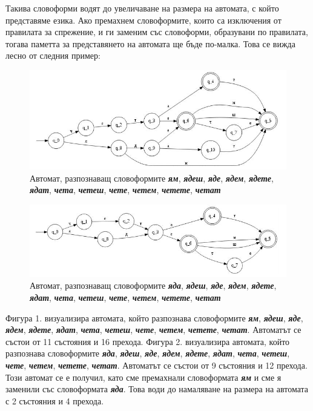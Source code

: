 \documentclass[a4paper,12pt]{article}
\begin{document}
  Такива словоформи водят до увеличаване на размера на автомата, с който представяме езика.
  Ако премахнем словоформите, които са изключения от правилата за спрежение, и ги заменим със словоформи, образувани по правилата,
  тогава паметта за представянето на автомата ще бъде по-малка.
  Това се вижда лесно от следния пример:

\begin{figure}[H]
  \centering
  \includegraphics{figures/example1.jpg}
  \caption{Автомат, разпознаващ словоформите \textbf{\emph{ям}}, \textbf{\emph{ядеш}}, \textbf{\emph{яде}},
  \textbf{\emph{ядем}}, \textbf{\emph{ядете}}, \textbf{\emph{ядат}},
  \textbf{\emph{чета}}, \textbf{\emph{четеш}}, \textbf{\emph{чете}},
  \textbf{\emph{четем}}, \textbf{\emph{четете}}, \textbf{\emph{четат}}}
\end{figure}

\begin{figure}[H]
  \centering
  \includegraphics{figures/example2.jpg}
  \caption{Автомат, разпознаващ словоформите \textbf{\emph{яда}}, \textbf{\emph{ядеш}}, \textbf{\emph{яде}},
  \textbf{\emph{ядем}}, \textbf{\emph{ядете}}, \textbf{\emph{ядат}},
  \textbf{\emph{чета}}, \textbf{\emph{четеш}}, \textbf{\emph{чете}},
  \textbf{\emph{четем}}, \textbf{\emph{четете}}, \textbf{\emph{четат}}}
\end{figure}

  Фигура 1. визуализира автомата, който разпознава словоформите
  \textbf{\emph{ям}}, \textbf{\emph{ядеш}}, \textbf{\emph{яде}},
  \textbf{\emph{ядем}}, \textbf{\emph{ядете}}, \textbf{\emph{ядат}},
  \textbf{\emph{чета}}, \textbf{\emph{четеш}}, \textbf{\emph{чете}},
  \textbf{\emph{четем}}, \textbf{\emph{четете}}, \textbf{\emph{четат}}.
  Автоматът се състои от 11 състояния и 16 прехода.
  Фигура 2. визуализира автомата, който разпознава словоформите
  \textbf{\emph{яда}}, \textbf{\emph{ядеш}}, \textbf{\emph{яде}},
  \textbf{\emph{ядем}}, \textbf{\emph{ядете}}, \textbf{\emph{ядат}},
  \textbf{\emph{чета}}, \textbf{\emph{четеш}}, \textbf{\emph{чете}},
  \textbf{\emph{четем}}, \textbf{\emph{четете}}, \textbf{\emph{четат}}.
  Автоматът се състои от 9 състояния и 12 прехода. Този автомат се е получил, като сме премахнали словоформата \textbf{\emph{ям}} и сме я заменили със словоформата
  \textbf{\emph{яда}}. Това води до намаляване на размера на автомата с 2 състояния и 4 прехода.
\end{document}
